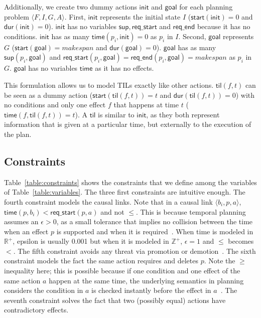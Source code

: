 \documentclass[10pt,journal,compsoc]{IEEEtran}
\newcommand{\tup}[1]{{\langle #1 \rangle}}
\newcommand{\dur}{\mathsf{dur}}    %
\newcommand{\obs}{\mathsf{obs}}    %
\newcommand{\start}{\mathsf{start}}%
\newcommand{\til}{\mathsf{til}}    %
\newcommand{\supp}{\mathsf{sup}}   %
\newcommand{\tim}{\mathsf{time}}   %
\newcommand{\reqs}{\mathsf{req\_{start}}} %
\newcommand{\reqe}{\mathsf{req\_{end}}}   %
\newcommand{\ini}{\mathsf{init}}   %
\newcommand{\goal}{\mathsf{goal}}  %
\begin{document}
Additionally, we create two dummy actions $\ini$ and $\goal$ for each planning problem $\tup{F,I,G,A}$. First, $\ini$ represents the initial state $I$ ($\start(\ini)=0$ and $\dur(\ini)=0$). $\ini$ has no variables $\supp, \reqs$ and $\reqe$ because it has no conditions. $\ini$ has as many $\tim(p_i,\ini)=0$ as $p_i$ in $I$. Second, $\goal$ represents $G$ ($\start(\goal)=makespan$ and $\dur(\goal)=0$). $\goal$ has as many $\supp(p_i,\goal)$ and $\reqs(p_i,\goal)=\reqe(p_i,\goal)=makespan$ as $p_i$ in $G$. $\goal$ has no variables $\tim$ as it has no effects.



This formulation allows us to model TILs
exactly like other actions. $\til(f,t)$ can be seen as a dummy action ($\start(\til(f,t))=t$ and $\dur(\til(f,t))=0$) with no conditions and only one effect $f$ that happens at time $t$ ($\tim(f,\til(f,t))=t$). A $\til$ is similar to $\ini$, as they both represent information that is given at a particular time, but externally to the execution of the plan. 



\subsection{Constraints}


Table~\ref{table:constraints} shows the constraints that we define among the variables of Table~\ref{table:variables}. The three first constraints are intuitive enough. The fourth constraint models the causal links. Note that in a causal link $\tup{b_i,p,a}$, $\tim(p,b_i) < \reqs(p,a)$ and not $\leq$. This is because temporal planning assumes an $\epsilon > 0$, as a small tolerance that implies no collision between the time when an effect $p$ is supported and when it is required~\cite{fox2003pddl2}. When time is modeled in $\mathbb{R}^+$, epsilon is usually 0.001 but when it is modeled in $\mathbb{Z}^+$, $\epsilon=1$ and $\leq$ becomes $<$.
The fifth constraint avoids any threat via promotion or demotion~\cite{ghallab2004automated}. The sixth constraint models the fact the same action requires and deletes $p$. Note the $\geq$ inequality here; this is possible because 
if one condition and one effect of the same action $a$ happen at the same time, the underlying semantics in planning considers the condition in $a$ is checked instantly before the effect in $a$~\cite{fox2003pddl2}. The seventh constraint solves the fact that two (possibly equal) actions have contradictory effects. 
\end{document}
